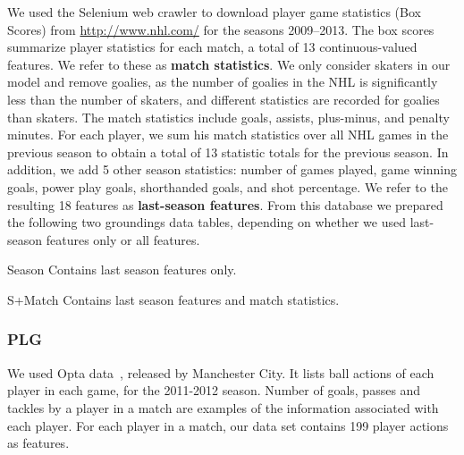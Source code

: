 \documentclass[conference]{IEEEtran}
\begin{document}
We used the Selenium web crawler \cite{bib:crawler} to download player game statistics (Box Scores) from \url{http://www.nhl.com/} for the seasons 2009--2013. The box scores summarize player statistics for each match, a total of 13 continuous-valued features. We refer to these as \textbf{match statistics}. We only consider skaters in our model and remove goalies, as the number of goalies in the NHL is significantly less than the number of skaters, and different statistics are recorded for goalies than skaters. The match statistics include goals, assists, plus-minus, and penalty minutes. For each player, we sum his match statistics over all NHL games in the previous season to obtain a total of 13 statistic totals for the previous season. In addition, we add 5 other season statistics: number of games played, game winning goals, power play goals, shorthanded goals, and shot percentage. We refer to the resulting 18 features as \textbf{last-season features}. From this database we prepared the following two groundings data tables, depending on whether we used last-season features only or all features.

\begin{LaTeXdescription}
\item[Season] Contains last season features only.
\item[S+Match] Contains last season features and match statistics.
\end{LaTeXdescription}



\subsubsection{PLG}
We used Opta data~\cite{bib:opta-original}, released by Manchester City. It lists ball actions of each player in each game, for the 2011-2012 season.
Number of goals, passes and tackles by a player in a match are examples of the information associated with each player.
For each player in a match, our data set contains 199 player actions as features.
\end{document}

